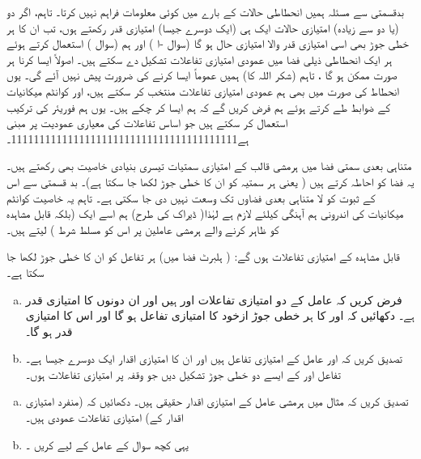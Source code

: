  بدقسمتی سے مسئلہ  ہمیں انحطاطی حالات  کے بارے میں کوئی معلومات فراہم نہیں کرتا۔ تاہم، اگر دو (یا دو سے زیادہ) امتیازی حالات ایک ہی (ایک دوسرے جیسا) امتیازی قدر رکھتے ہوں، تب ان کا ہر خطی جوڑ بھی اسی امتیازی قدر والا امتیازی حال ہو گا (سوال -ا ) اور ہم  (سوال ) استعمال کرتے ہوئے ہر ایک انحطاطی ذیلی فضا میں عمودی امتیازی تفاعلات تشکیل دے سکتے ہیں۔ اصولاً  ایسا کرنا ہر صورت ممکن ہو گا ، تاہم (شکر اللہ کا) ہمیں عموماً ایسا کرنے کی ضرورت پیش نہیں آئے گی۔ یوں انحطاط کی صورت میں بھی ہم عمودی امتیازی تفاعلات منتخب کر سکتے ہیں، اور کوانٹم میکانیات کے ضوابط طے کرتے ہوئے ہم فرض کریں گے کہ ہم ایسا کر چکے ہیں۔ یوں ہم فوریئر کی ترکیب استعمال کر سکتے ہیں جو اساس تفاعلات کی معیاری عمودیت پر مبنی ہے1111111111111111111111111111111111111111۔
 
 متناہی بعدی سمتی فضا میں ہرمشی قالب کے امتیازی سمتیات تیسری بنیادی خاصیت بھی رکھتے ہیں۔ یہ فضا کو احاطہ کرتے ہیں ( یعنی ہر سمتیہ کو ان کا خطی جوڑ لکھا جا سکتا ہے)۔ بد قسمتی سے اس کے ثبوت کو لا متناہی بعدی فضاوں تک وسعت نہیں دی جا سکتی ہے۔ تاہم یہ خاصیت کوانٹم میکانیات کی اندرونی ہم آہنگی کیلئے لازم ہے لہٰذا( ڈیراک کی طرح) ہم اسے ایک  (بلکہ قابل مشاہدہ کو ظاہر کرنے والے ہرمشی عاملین پر اس کو مسلط شرط ) لیتے ہیں۔
 
 قابل مشاہدہ کے امتیازی تفاعلات  ہوں گے: ( ہلبرٹ فضا میں) ہر تفاعل کو ان کا خطی جوڑ لکھا جا سکتا ہے۔ 

\begin{enumerate}[a.]
\item
 فرض کریں کہ عامل  کے دو امتیازی تفاعلات  اور  ہیں اور ان دونوں کا امتیازی قدر  ہے۔ دکھائیں کہ  اور  کا ہر خطی جوڑ ازخود  کا امتیازی تفاعل ہو گا اور اس کا امتیازی قدر  ہو گا۔
\item
 تصدیق کریں کہ  اور  عامل  کے امتیازی تفاعل ہیں اور ان کا امتیازی اقدار ایک دوسرے جیسا ہے۔تفاعل  اور  کے ایسے دو خطی جوڑ تشکیل دیں جو وقفہ  پر  امتیازی تفاعلات ہوں۔
\end{enumerate}
\begin{enumerate}[a.]
\item
 تصدیق کریں کہ مثال  میں ہرمشی عامل کے امتیازی اقدار حقیقی ہیں۔ دکھائیں کہ (منفرد امتیازی اقدار کے) امتیازی تفاعلات عمودی ہیں۔ 
\item
 یہی کچھ سوال  کے عامل کے لیے کریں ۔
\end{enumerate}


